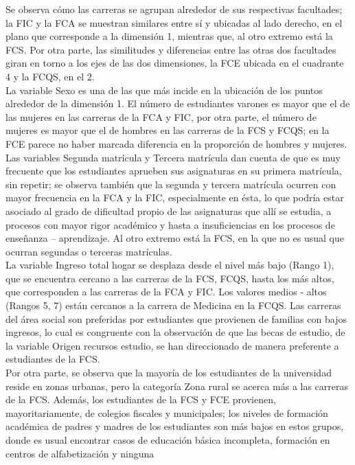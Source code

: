 \documentclass[water,article,submit,moreauthors,pdftex]{mdpi}
\begin{document}
Se observa cómo las carreras se agrupan alrededor de sus respectivas
facultades; la FIC y la FCA se muestran similares entre sí y ubicadas al
lado derecho, en el plano que corresponde a la dimensión 1, mientras
que, al otro extremo está la FCS. Por otra parte, las similitudes y
diferencias entre las otras dos facultades giran en torno a los ejes de
las dos dimensiones, la FCE ubicada en el cuadrante 4 y la FCQS, en el
2.\\
La variable Sexo es una de las que más incide en la ubicación de los
puntos alrededor de la dimensión 1. El número de estudiantes varones es
mayor que el de las mujeres en las carreras de la FCA y FIC, por otra
parte, el número de mujeres es mayor que el de hombres en las carreras
de la FCS y FCQS; en la FCE parece no haber marcada diferencia en la
proporción de hombres y mujeres. Las variables Segunda matrícula y
Tercera matrícula dan cuenta de que es muy frecuente que los estudiantes
aprueben sus asignaturas en su primera matrícula, sin repetir; se
observa también que la segunda y tercera matrícula ocurren con mayor
frecuencia en la FCA y la FIC, especialmente en ésta, lo que podría
estar asociado al grado de dificultad propio de las asignaturas que allí
se estudia, a procesos con mayor rigor académico y hasta a
insuficiencias en los procesos de enseñanza -- aprendizaje. Al otro
extremo está la FCS, en la que no es usual que ocurran segundas o
terceras matrículas.\\
La variable Ingreso total hogar se desplaza desde el nivel más bajo
(Rango 1), que se encuentra cercano a las carreras de la FCS, FCQS,
hasta los más altos, que corresponden a las carreras de la FCA y FIC.
Los valores medios - altos (Rangos 5, 7) están cercanos a la carrera de
Medicina en la FCQS. Las carreras del área social son preferidas por
estudiantes que provienen de familias con bajos ingresos, lo cual es
congruente con la observación de que las becas de estudio, de la
variable Origen recursos estudio, se han direccionado de manera
preferente a estudiantes de la FCS.\\
Por otra parte, se observa que la mayoría de los estudiantes de la
universidad reside en zonas urbanas, pero la categoría Zona rural se
acerca más a las carreras de la FCS. Además, los estudiantes de la FCS y
FCE provienen, mayoritariamente, de colegios fiscales y municipales; los
niveles de formación académica de padres y madres de los estudiantes son
más bajos en estos grupos, donde es usual encontrar casos de educación
básica incompleta, formación en centros de alfabetización y ninguna
\end{document}
